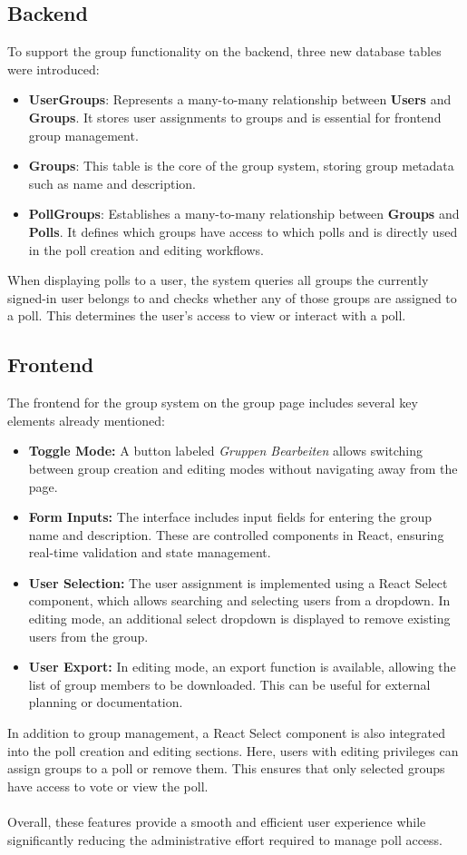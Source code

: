 \documentclass[a4paper,12pt]{report}
\begin{document}
\subsection{Backend}

To support the group functionality on the backend, three new database tables were introduced:

\begin{itemize}
	\item \textbf{UserGroups}: Represents a many-to-many relationship between \textbf{Users} and \textbf{Groups}. It stores user assignments to groups and is essential for frontend group management.
	\item \textbf{Groups}: This table is the core of the group system, storing group metadata such as name and description.
	\item \textbf{PollGroups}: Establishes a many-to-many relationship between \textbf{Groups} and \textbf{Polls}. It defines which groups have access to which polls and is directly used in the poll creation and editing workflows. \\
\end{itemize}
When displaying polls to a user, the system queries all groups the currently signed-in user belongs to and checks whether any of those groups are assigned to a poll. This determines the user's access to view or interact with a poll.

\subsection{Frontend}
The frontend for the group system on the group page includes several key elements already mentioned:
\begin{itemize}
	\item \textbf{Toggle Mode:} A button labeled \textit{Gruppen Bearbeiten} allows switching between group creation and editing modes without navigating away from the page.
	\item \textbf{Form Inputs:} The interface includes input fields for entering the group name and description. These are controlled components in React, ensuring real-time validation and state management.
	\item \textbf{User Selection:} The user assignment is implemented using a React Select component, which allows searching and selecting users from a dropdown. In editing mode, an additional select dropdown is displayed to remove existing users from the group.
	\item \textbf{User Export:} In editing mode, an export function is available, allowing the list of group members to be downloaded. This can be useful for external planning or documentation.
\end{itemize}
In addition to group management, a React Select component is also integrated into the poll creation and editing sections. Here, users with editing privileges can assign groups to a poll or remove them. This ensures that only selected groups have access to vote or view the poll. \\ \\
Overall, these features provide a smooth and efficient user experience while significantly reducing the administrative effort required to manage poll access.
\end{document}
